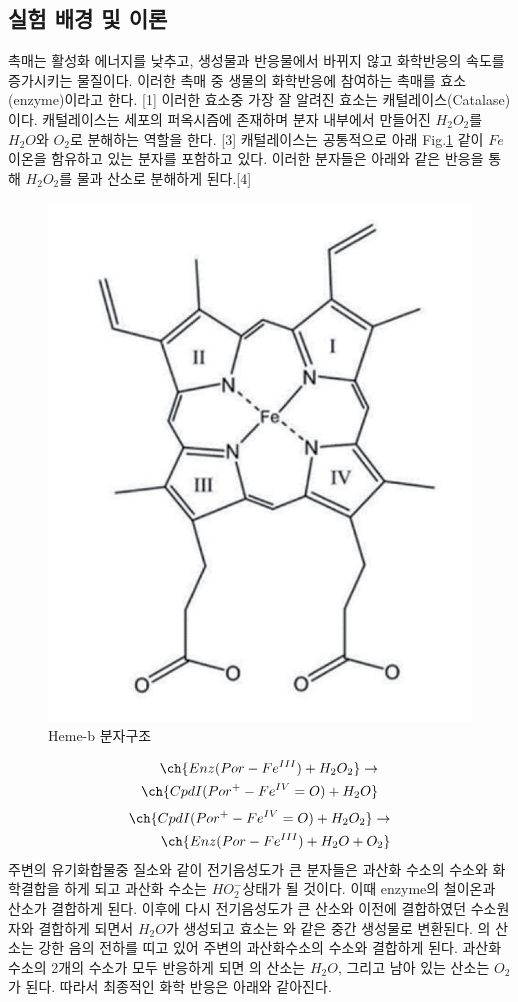 \documentclass[%
 reprint,
 amsmath,amssymb,
 aps,
]{revtex4-2}
\begin{document}
\subsection{\label{sec:level2}실험 배경 및 이론}
촉매는 활성화 에너지를 낮추고, 생성물과 반응물에서 바뀌지 않고 화학반응의 속도를 증가시키는 물질이다. 이러한 촉매 중 생물의 화학반응에 참여하는 촉매를 효소(enzyme)이라고 한다. [1] 이러한 효소중 가장 잘 알려진 효소는 캐털레이스(Catalase)이다. 캐털레이스는 세포의 퍼옥시즘에 존재하며 분자 내부에서 만들어진  $H_{2}O_{2}$를 $H_{2}O$와 $O_{2}$로 분해하는 역할을 한다. [3] 캐털레이스는 공통적으로 아래 Fig.\ref{fig:heme} 같이 $Fe$ 이온을 함유하고 있는 분자를 포함하고 있다. 이러한 분자들은 아래와 같은 반응을 통해 $H_{2}O_{2}$를 물과 산소로 분해하게 된다.[4] 
\begin{figure}[htbp]
	\includegraphics[width = 0.6\linewidth]{heme.png}%
	\caption{\label{fig:heme}Heme-b 분자구조}
\end{figure}
\begin{align}
	\begin{split}
		\ch{Enz(Por-Fe^{III}) + H_{2}O_{2}} \rightarrow \\
		\ch{Cpd I (Por^{+}-Fe^{IV} = O ) + H_{2}O} 
	\end{split}
\end{align}
\begin{align}
	\begin{split}
		\ch{Cpd I (Por^{+}-Fe^{IV} = O ) +  H_{2}O_{2}} \rightarrow \\
		\ch{Enz(Por-Fe^{III}) + H_{2}O + O_{2}}
	\end{split}
\end{align}
주변의 유기화합물중 질소와 같이 전기음성도가 큰 분자들은 과산화 수소의 수소와 화학결합을 하게 되고 과산화 수소는 $HO_{2}^{-}$상태가 될 것이다. 이때 enzyme의 철이온과 산소가 결합하게 된다. 이후에 다시 전기음성도가 큰 산소와 이전에 결합하였던 수소원자와 결합하게 되면서 $H_{2}O$가 생성되고 효소는 와 같은 중간 생성물로 변환된다. 의 산소는 강한 음의 전하를 띠고 있어 주변의 과산화수소의 수소와 결합하게 된다. 과산화 수소의 2개의 수소가 모두 반응하게 되면 의 산소는 $H_{2}O$, 그리고 남아 있는 산소는 $O_{2}$가 된다. 따라서 최종적인 화학 반응은 아래와 같아진다.
\end{document}
